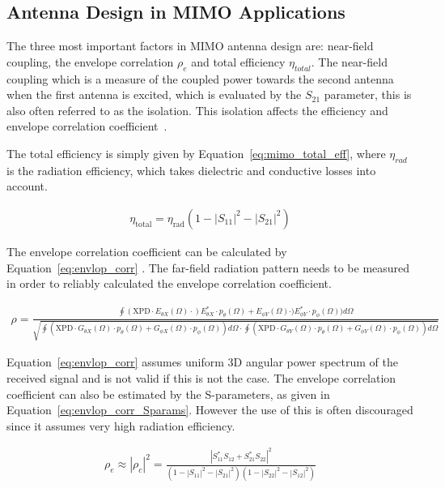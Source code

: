 \subsection{Antenna Design in MIMO Applications}
The three most important factors in MIMO antenna design are: near-field coupling, the envelope correlation $\rho_e$ and total efficiency $\eta_{total}$. The near-field coupling which is a measure of the coupled power towards the second antenna when the first antenna is excited, which is evaluated by the $S_{21}$ parameter, this is also often referred to as the isolation. This isolation affects the efficiency and envelope correlation coefficient~\cite{Tatomirescu2011PortIsolation}. 

The total efficiency is simply given by Equation~\ref{eq:mimo_total_eff}\cite{Tatomirescu2011PortIsolation}, where $\eta_{rad}$ is the radiation efficiency, which takes dielectric and conductive losses into account. 

\begin{align} 
\label{eq:mimo_total_eff}
\eta_{\text{total}}=\eta_{\text{rad}} (1-|S_{11}|^2 - |S_{21}|^2)
\end{align}


The envelope correlation coefficient can be calculated by Equation~\ref{eq:envlop_corr} \cite{Tatomirescu2011PortIsolation}. The far-field radiation pattern needs to be measured in order to reliably calculated the envelope correlation coefficient.

\begin{align} 
\label{eq:envlop_corr}
\rho = \frac{\oint(\text{XPD} \cdot E_{\theta X}(\Omega) \cdot) E^*_{\theta X} \cdot p_\theta(\Omega)+E_{\phi Y}(\Omega) \cdot) E^*_{\phi Y} \cdot p_\phi(\Omega) )d\Omega}{\sqrt{\oint(\text{XPD}\cdot G_{\theta X}(\Omega) \cdot p_\theta(\Omega)+G_{\phi X}(\Omega) \cdot p_\phi(\Omega))d\Omega \cdot \oint(\text{XPD}\cdot G_{\theta Y}(\Omega) \cdot p_\theta(\Omega)+G_{\phi Y}(\Omega) \cdot p_\phi(\Omega))d\Omega }}
\end{align}

Equation~\ref{eq:envlop_corr} assumes uniform 3D angular power spectrum of the received signal and is not valid if this is not the case. The envelope correlation coefficient can also be estimated by the S-parameters, as given in Equation~\ref{eq:envlop_corr_Sparams}\cite{Alain2010MIMO}. However the use of this is often discouraged since it assumes very high radiation efficiency. 

\begin{align}
\label{eq:envlop_corr_Sparams}
  \rho_e \approx |\rho_c|^2 = \frac{|S^*_{11}S_{12}+S^*_{21}S_{22}|^2}{(1-|S_{11}|^2-|S_{21}|^2)(1-|S_{22}|^2-|S_{12}|^2)}
\end{align}

